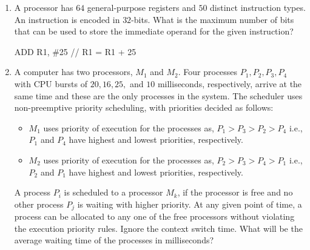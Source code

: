 \documentclass[a4paper, 11pt]{article}
\begin{document}
\begin{enumerate}
    \item A processor has $64$ general-purpose registers and $50$ distinct instruction types. An instruction is encoded in $32$-bits. What is the maximum number of bits that can be used to store the immediate operand for the given instruction?
    \begin{center}
    ADD R1, \#25 \quad // R1 = R1 + 25
    \end{center}    
    \begin{enumerate}
    \end{enumerate}
    \hfill{}
    \item A computer has two processors, $M_1$ and $M_2$. Four processes $P_1, P_2, P_3, P_4$ with CPU bursts of $20, 16, 25,$ and $10$ milliseconds, respectively, arrive at the same time and these are the only processes in the system. The scheduler uses non-preemptive priority scheduling, with priorities decided as follows:
    \begin{itemize}
        \item $M_1$ uses priority of execution for the processes as, $P_1 > P_3 > P_2 > P_4$ i.e., $P_1$ and $P_4$ have highest and lowest priorities, respectively.
        \item $M_2$ uses priority of execution for the processes as, $P_2 > P_3 > P_4 > P_1$ i.e., $P_2$ and $P_1$ have highest and lowest priorities, respectively.
    \end{itemize}
    A process $P_i$ is scheduled to a processor $M_k$, if the processor is free and no other process $P_j$ is waiting with higher priority. At any given point of time, a process can be allocated to any one of the free processors without violating the execution priority rules. Ignore the context switch time. What will be the average waiting time of the processes in milliseconds?
    \begin{enumerate}
    \end{enumerate}


\end{enumerate}
\end{document}
